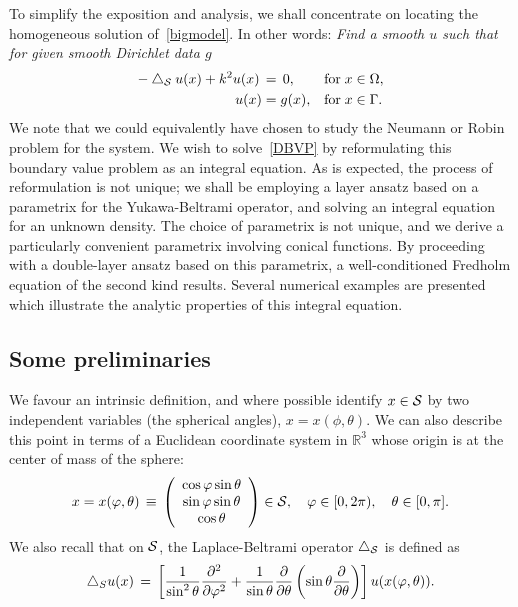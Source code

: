 To simplify the exposition and analysis, we shall concentrate on
locating the homogeneous solution of~\eqref{bigmodel}.  In other words:
{\it Find a smooth $u$ such that for given smooth Dirichlet data $g$}
\begin{subequations}
  \label{DBVP}
  \begin{align}
    -\lap_{\S} u(x) +k^2u(x)\, &= \, 0, &&\mbox{for} \; 
      x \in { \Omega},\\
    u(x) &= g(x), &&\mbox{for} \; x \in \Gamma.
  \end{align}
\end{subequations}
We note that we could equivalently have chosen to study the Neumann or
Robin problem for the system.  We wish to solve~\eqref{DBVP} by
reformulating this boundary value problem as an integral equation. As is
expected, the process of reformulation is not unique; we shall be
employing a layer ansatz based on a parametrix for the Yukawa-Beltrami
operator, and solving an integral equation for an unknown density.  The
choice of parametrix is not unique, and we derive a particularly
convenient parametrix involving conical functions. By proceeding with a
double-layer ansatz based on this parametrix, a well-conditioned
Fredholm equation of the second kind results. Several numerical examples
are presented which illustrate the analytic properties of this integral
equation.


\subsection{Some preliminaries}
We favour an intrinsic definition, and where possible identify $x\in \S$
by two independent variables (the spherical angles), $x=x(\phi,\theta)$.
We can also describe this point in terms of a Euclidean coordinate
system in $\mathbb{R}^3$ whose origin is at the center of mass of the
sphere: 
\begin{align*}
 x= x(\varphi,\theta) \, \equiv \, \left( 
  \begin{array}{c}
    \cos \varphi \sin \theta \\
    \sin \varphi \sin \theta \\
    \cos \theta
  \end{array} 
  \right) \in{\S}, \quad \varphi \in [0,2\pi), 
    \quad \theta \in [0,\pi].
\end{align*}
We also recall that on $\S$, the Laplace-Beltrami operator  $\lap_\S$
is defined as
\begin{align*}
  \lap_S u(x) \, = \, \left[
  \frac{1}{\sin^2 \theta} \frac{\partial^2}{\partial \varphi^2} +
  \frac{1}{\sin \theta} \frac{\partial}{\partial \theta}
  \left(\sin \theta \frac{\partial}{ \partial \theta}\right)
  \right] u(x(\varphi,\theta)).
\end{align*}

